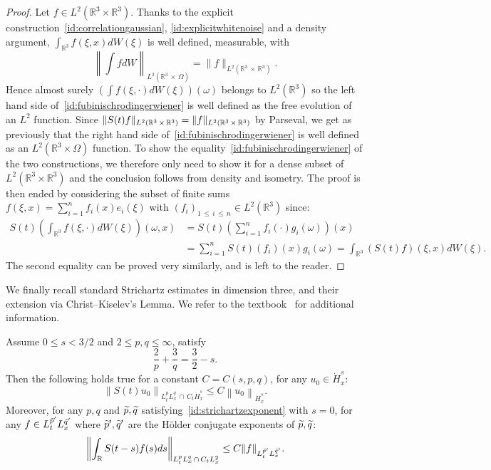 \documentclass[AHL, Unicode, longabstracts,published]{cedram}
\newcommand{\R}{\mathbb{R}}
\let\oldtilde\tilde
\renewcommand*{\tilde}[1]{\mathchoice{\widetilde{#1}}{\widetilde{#1}}{\oldtilde{#1}}{\oldtilde{#1}}}
\begin{document}
\begin{proof}
Let $f\in L^2(\R^3\times \R^3)$. Thanks to the explicit construction~\eqref{id:correlationgaussian}, \eqref{id:explicitwhitenoise} and a density argument, $\int_{\R^3} f(\xi,x)dW(\xi)$ is well defined, measurable, with 
\[
\left\|\int fdW\right\|_{L^2\left(\R^3\,\times\,\Omega\right)}=\| f \|_{L^2\left(\R^3\,\times\,\R^3\right)}.
\]
Hence almost surely $ (\int f(\xi,\cdot)dW(\xi))(\omega)$ belongs to $L^2(\R^3)$ so the left hand side of~\eqref{id:fubinischrodingerwiener} is well defined as the free evolution of an $L^2$ function. Since $\|S(t)f\|_{L^2(\R^3\,\times\,\R^3)}\linebreak =\|f\|_{L^2(\R^3\,\times\,\R^3)}$ by Parseval, we get as previously that the right hand side of~\eqref{id:fubinischrodingerwiener} is well defined as an $L^2(\R^3\times \Omega)$ function. To show the equality~\eqref{id:fubinischrodingerwiener} of the two constructions, we therefore only need to show it for a dense subset of $L^2(\R^3\times \R^3)$ and the conclusion follows from density and isometry. The proof is then ended by considering the subset of finite sums $f(\xi,x)=\sum_{i=1}^n f_i(x)e_i(\xi)$ with $(f_i)_{1\,\leq\,i\,\leq \,n} \in L^2(\R^3)$ since:
\begin{align*}
S(t) \left(\int_{\R^3} f(\xi,\cdot)dW(\xi) \right)(\omega,x)&=S(t) \left(\sum_{i=1}^n f_i(\cdot) g_i(\omega) \right)(x)\\
&=\sum_{i=1}^n S(t)(f_i)(x) g_i(\omega) = \int_{\R^3} (S(t) f)(\xi,x)dW(\xi).
\end{align*}
The second equality can be proved very similarly, and is left to the reader.
\end{proof}


We finally recall standard Strichartz estimates in dimension three, and their extension via Christ--Kiselev's Lemma. We refer to the textbook~\cite{tao} for additional information.


\begin{lemm}\label{lem:strichartz}
Assume $0\leq s<3/2$ and $2\leq p,q \leq \infty$, satisfy
\begin{equation}\label{id:strichartzexponent}
\frac2{p}+\frac3{q} = \frac 32-s.
\end{equation}
Then the following holds true for a constant $C=C(s,p,q)$, for any $u_0\in \dot H^s_x$:
\begin{equation} \label{bd:homostrichartz}
\left\| S(t)u_0\right\|_{L^p_tL^q_x\,\cap\,C_t\dot H^s_x}\leq C \left\| u_0\right\|_{\dot H^s_x}.
\end{equation}
Moreover, for any $p,q$ and $\tilde p,\tilde q$ satisfying~\eqref{id:strichartzexponent} with $s=0$, for any $f\in L^{\tilde p'}_tL^{\tilde q'}_x$ where $\tilde p',\tilde q'$ are the H\"older conjugate exponents of $\tilde p,\tilde q$:
\begin{equation} \label{bd:dualstrichartz}
\left\| \int_{\R} S(t-s)f(s)ds \right\|_{L^{p}_tL^q_x\,\cap\,C_t L^2_x}\leq C\| f\|_{L^{\tilde p'}_tL^{\tilde q'}_x}.
\end{equation}
\end{lemm}
\vspace{10pt}
\pagebreak



\end{document}
